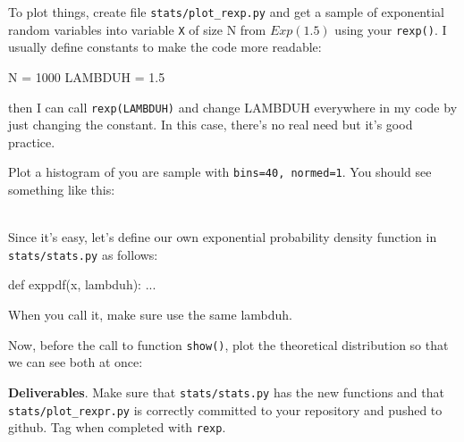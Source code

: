 \begin{fullwidth}
\step To plot things, create file {\tt stats/plot\_rexp.py} and get a sample of exponential random variables into variable {\tt X} of size N from $Exp(1.5)$ using your {\tt rexp()}. I usually define constants to make the code more readable:

\begin{pyverbatim}
N = 1000
LAMBDUH = 1.5
\end{pyverbatim}

\noindent then I can call {\tt rexp(LAMBDUH)} and change LAMBDUH everywhere in my code by just changing the constant. In this case, there's no real need but it's good practice.

\step  Plot a histogram of you are sample with {\tt bins=40, normed=1}.  You should see something like this:


\\

\step Since it's easy, let's define our own exponential probability density function in {\tt stats/stats.py} as follows:

\begin{pyverbatim}
def exppdf(x, lambduh):
    ...
\end{pyverbatim}

\noindent When you call it, make sure use the same lambduh.

\step Now, before the call to function {\tt show()}, plot the theoretical distribution so that we can see both at once:



\begin{callout}{\bcplume}
{\bf Deliverables}. Make sure that {\tt stats/stats.py} has the new functions and that {\tt stats/plot\_rexpr.py} is correctly committed to your repository and pushed to github. Tag when completed with {\tt rexp}.
\end{callout}

\end{fullwidth}
